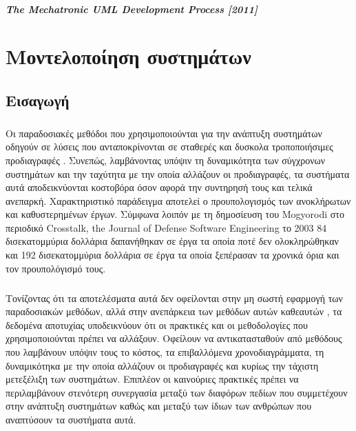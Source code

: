 \documentclass[a4paper,12pt,twoside]{report}
\begin{document}
{				\paragraph{The Mechatronic UML Development Process [2011] }{
				}
				
				
				
				
	\chapter{Μοντελοποίηση συστημάτων}
		\label{κεφ.:Μοντελοποίηση συστημάτων}

		\section{Εισαγωγή}
			\paragraph{} {Οι παραδοσιακές μεθόδοι που χρησιμοποιούνται για την ανάπτυξη συστημάτων οδηγούν σε λύσεις που ανταποκρίνονται σε σταθερές και δυσκολα τροποποιήσιμες προδιαγραφές . Συνεπώς, λαμβάνοντας υπόψιν τη δυναμικότητα των σύγχρονων συστημάτων και την ταχύτητα με την οποία αλλάζουν οι προδιαγραφές, τα συστήματα αυτά αποδεικνύονται κοστοβόρα όσον αφορά την συντηρησή τους και τελικά ανεπαρκή. Χαρακτηριστικό παράδειγμα αποτελεί ο προυπολογισμός των ανοκλήρωτων και καθυστερημένων έργων. Σύμφωνα λοιπόν με τη δημοσίευση του Mogyorodi στο περιοδικό Crosstalk, the Journal of Defense Software Engineering το 2003 \cite{JournalDefenseMogyorodi} 84 δισεκατομμύρια δολλάρια δαπανήθηκαν σε έργα τα οποία ποτέ δεν ολοκληρώθηκαν και 192 δισεκατομμύρια δολλάρια σε έργα τα οποία ξεπέρασαν τα χρονικά όρια και τον προυπολόγισμό τους.
			}
			\paragraph{} {Τονίζοντας ότι τα αποτελέσματα αυτά δεν οφείλονται στην μη σωστή εφαρμογή των παραδοσιακών μεθόδων, αλλά στην ανεπάρκεια των μεθόδων αυτών καθεαυτών \cite{MDSysDevelIBM}, τα δεδομένα αποτυχίας υποδεικνύουν ότι οι πρακτικές και οι μεθοδολογίες που χρησιμοποιούνται πρέπει να αλλάξουν. Οφείλουν να αντικατασταθούν από μεθόδους που λαμβάνουν υπόψιν τους το κόστος, τα επιβαλλόμενα χρονοδιαγράμματα, τη δυναμικότηκα με την οποία αλλάζουν οι προδιαγραφές και κυρίως την τάχιστη μετεξέλιξη των συστημάτων. Επιπλέον οι καινούριες πρακτικές πρέπει να περιλαμβάνουν στενότερη συνεργασία μεταξύ των διαφόρων πεδίων που συμμετέχουν στην ανάπτυξη συστημάτων καθώς και μεταξύ των ίδιων των ανθρώπων που αναπτύσουν τα συστήματα αυτά. 
			}
			
}
\end{document}
